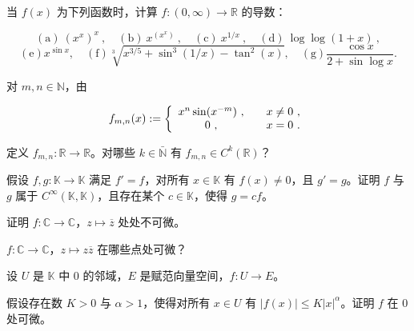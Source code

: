 \exerciseshead

\begin{exercises}
\item

当 $ f(x) $ 为下列函数时，计算 $ f: (0, \infty) \to \mathbb{R} $ 的导数：

\[
\mathrm{(a)~}(x^{x})^{x}~,\quad\mathrm{(b)~}x^{(x^{x})}~,\quad\mathrm{(c)~}x^{1/x}~,\quad\mathrm{(d)~}\log\log(1+x)~,
\]
\[
\mathrm{(e)}x^{\sin x},\quad\mathrm{(f)}\sqrt[3]{x^{3/5}+\sin^{3}(1/x)-\tan^{2}(x)},\quad\mathrm{(g)}\frac{\cos x}{2+\sin\log x}.
\]
\item

对 $ m, n \in \mathbb{N} $，由

\begin{equation*}
f_{m,n}(x):=\left\{\begin{array}{c l}{x^{n}\operatorname{s i n}(x^{-m})~,}&{\quad x\neq0~,}\\ {0~,}&{\quad x=0~.}\\ \end{array}\right.
\end{equation*}

定义 $ f_{m,n} : \mathbb{R} \to \mathbb{R} $。对哪些 $ k \in \bar{\mathbb{N}} $ 有 $ f_{m,n} \in C^k(\mathbb{R}) $？

\item

假设 $ f, g: \mathbb{K} \to \mathbb{K} $ 满足 $ f' = f $，对所有 $ x \in \mathbb{K} $ 有 $ f(x) \neq 0 $，且 $ g' = g $。证明 $ f $ 与 $ g $ 属于 $ C^\infty(\mathbb{K}, \mathbb{K}) $，且存在某个 $ c \in \mathbb{K} $，使得 $ g = cf $。

\item

证明 $ f: \mathbb{C} \to \mathbb{C} $，$ z \mapsto \overline{z} $ 处处不可微。

\item

$f: \mathbb{C} \to \mathbb{C}$，$z \mapsto z\overline{z}$ 在哪些点处可微？

\item

设 $U$ 是 $\mathbb{K}$ 中 $0$ 的邻域，$E$ 是赋范向量空间，$f: U \to E$。

\begin{items}
\item

假设存在数 $ K > 0 $ 与 $ \alpha > 1 $，使得对所有 $ x \in U $ 有 $ |f(x)| \leq K|x|^\alpha $。证明 $ f $ 在 0 处可微。


\end{items}
\end{exercises}
